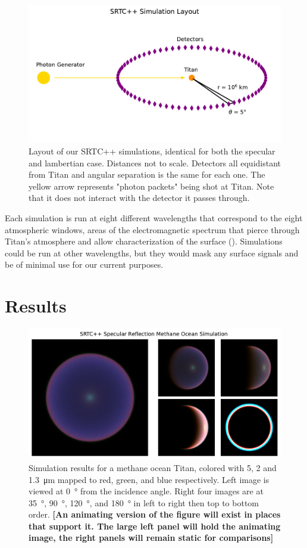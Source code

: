 \documentclass{article}
\begin{document}
\begin{figure}[htbp]
\includegraphics[scale = 0.5]{SRTCLayout.pdf}
\centering
\caption{Layout of our SRTC++ simulations, identical for both the specular and lambertian case. Distances not to scale. Detectors all equidistant from Titan and angular separation is the same for each one. The yellow arrow represents "photon packets" being shot at Titan. Note that it does not interact with the detector it passes through.}
\label{fig:5}
\end{figure}

Each simulation is run at eight different wavelengths that correspond to the eight atmospheric windows, areas of the electromagnetic spectrum that pierce through Titan's atmosphere and allow characterization of the surface (\cite{Barnes2007}). Simulations could be run at other wavelengths, but they would mask any surface signals and be of minimal use for our current purposes. 

\section{Results}

\begin{figure}[htbp]
\includegraphics[scale = 0.5]{SpecularSim.pdf}
\centering
\caption{Simulation results for a methane ocean Titan, colored with 5, 2 and \qty{1.3}{\micro\meter} mapped to red, green, and blue respectively. Left image is viewed at \qty{0}{\degree} from the incidence angle. Right four images are at  \qty{35}{\degree},  \qty{90}{\degree},  \qty{120}{\degree}, and  \qty{180}{\degree} in left to right then top to bottom order. \textbf{\color{red} [An animating version of the figure will exist in places that support it. The large left panel will hold the animating image, the right panels will remain static for comparisons] \color{black}}}
\label{fig:6}
\end{figure}
\end{document}
